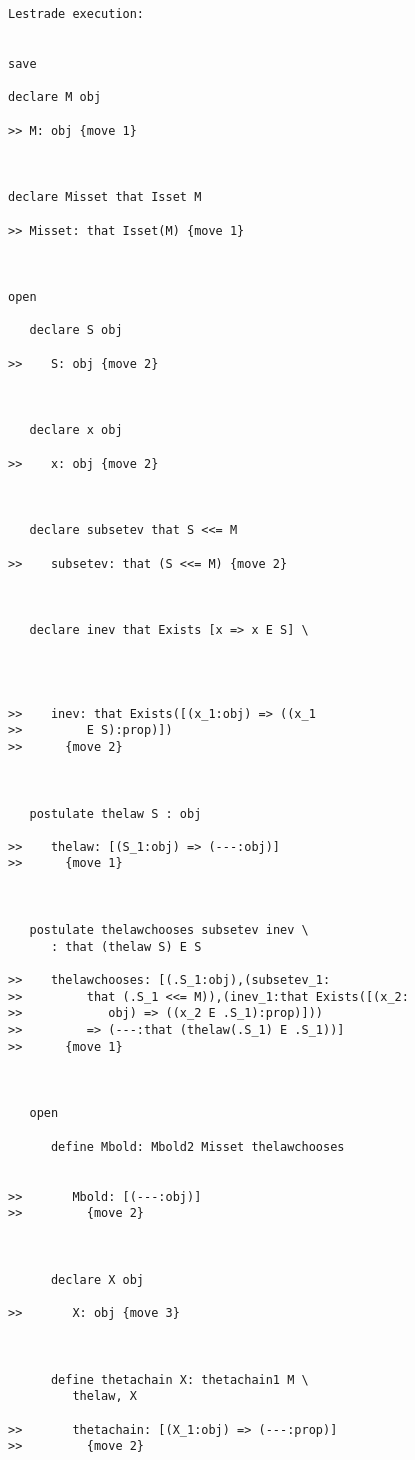 \documentclass[12pt]{article}
\begin{document}
\begin{verbatim}Lestrade execution:


save

declare M obj

>> M: obj {move 1}



declare Misset that Isset M

>> Misset: that Isset(M) {move 1}



open

   declare S obj

>>    S: obj {move 2}



   declare x obj

>>    x: obj {move 2}



   declare subsetev that S <<= M

>>    subsetev: that (S <<= M) {move 2}



   declare inev that Exists [x => x E S] \
      



>>    inev: that Exists([(x_1:obj) => ((x_1
>>         E S):prop)])
>>      {move 2}



   postulate thelaw S : obj

>>    thelaw: [(S_1:obj) => (---:obj)]
>>      {move 1}



   postulate thelawchooses subsetev inev \
      : that (thelaw S) E S

>>    thelawchooses: [(.S_1:obj),(subsetev_1:
>>         that (.S_1 <<= M)),(inev_1:that Exists([(x_2:
>>            obj) => ((x_2 E .S_1):prop)]))
>>         => (---:that (thelaw(.S_1) E .S_1))]
>>      {move 1}



   open

      define Mbold: Mbold2 Misset thelawchooses


>>       Mbold: [(---:obj)]
>>         {move 2}



      declare X obj

>>       X: obj {move 3}



      define thetachain X: thetachain1 M \
         thelaw, X

>>       thetachain: [(X_1:obj) => (---:prop)]
>>         {move 2}




\end{verbatim}
\end{document}
